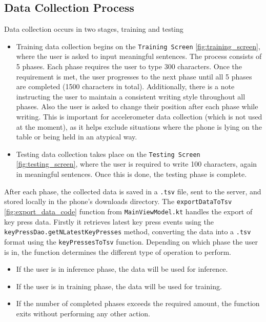 \subsection{Data Collection Process}
\label{sec:data_collection}
Data collection occurs in two stages, training and testing
\begin{itemize}
	\item 
	Training data collection begins on the \texttt{Training Screen} \ref{fig:training_screen}, where the user is asked to input meaningful sentences. The process consists of 5 phases. Each phase requires the user to type 300 characters. Once the requirement is met, the user progresses to the next phase until all 5 phases are completed (1500 characters in total). Additionally, there is a note instructing the user to maintain a consistent writing style throughout all phases. Also the user is asked to change their position after each phase while writing. This is important for accelerometer data collection (which is not used at the moment), as it helps exclude situations where the phone is lying on the table or being held in an atypical way.  
	\item 
	Testing data collection takes place on the \texttt{Testing Screen} \ref{fig:testing_screen}, where the user is required to write 100 characters, again in meaningful sentences. Once this is done, the testing phase is complete.
\end{itemize}
After each phase, the collected data is saved in a \texttt{.tsv} file, sent to the server, and stored locally in the phone's downloads directory. The \texttt{exportDataToTsv} \ref{fig:export_data_code} function from \texttt{MainViewModel.kt} handles the export of key press data. \newline Firstly it retrieves latest key press events using the \texttt{keyPressDao.getNLatestKeyPresses} method, converting the data into a \texttt{.tsv} format using the \texttt{keyPressesToTsv} function. \newline
Depending on which phase the user is in, the function determines the different type of operation to perform.
\begin{itemize}
	\item 
	If the user is in inference phase, the data will be used for inference.
	\item 
	If the user is in training phase, the data will be used for training.
	\item 
	If the number of completed phases exceeds the required amount, the function exits without performing any other action.
\end{itemize}

